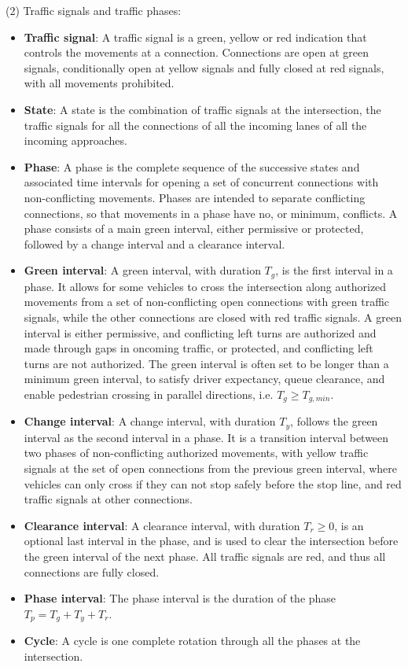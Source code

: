 (2) Traffic signals and traffic phases:
\begin{itemize}
\setlength\itemsep{-0.5em}
  \item \textbf{Traffic signal}: A traffic signal is a green, yellow or red indication that controls the movements at a connection. Connections are open at green signals, conditionally open at yellow signals and fully closed at red signals, with all movements prohibited.
  \item \textbf{State}: A state is the combination of traffic signals at the intersection, the traffic signals for all the connections of all the incoming lanes of all the incoming approaches.
  \item \textbf{Phase}: A phase is the complete sequence of the successive states and associated time intervals for opening a set of concurrent connections with non-conflicting movements. Phases are intended to separate conflicting connections, so that movements in a phase have no, or minimum, conflicts. A phase consists of a main green interval, either permissive or protected, followed by a change interval and a clearance interval.
  \item \textbf{Green interval}: A green interval, with duration $T_g$, is the first interval in a phase. It allows for some vehicles to cross the intersection along authorized movements from a set of non-conflicting open connections with green traffic signals, while the other connections are closed with red traffic signals. A green interval is either permissive, and conflicting left turns are authorized and made through gaps in oncoming traffic, or protected, and conflicting left turns are not authorized. The green interval is often set to be longer than a minimum green interval, to satisfy driver expectancy, queue clearance, and enable pedestrian crossing in parallel directions, i.e. $T_g \ge T_{g,min}$. 
  \item \textbf{Change interval}: A change interval, with duration $T_y$, follows the green interval as the second interval in a phase. It is a transition interval between two phases of non-conflicting authorized movements, with yellow traffic signals at the set of open connections from the previous green interval,  where vehicles can only cross if they can not stop safely before the stop line, and red traffic signals at other connections.
  \item \textbf{Clearance interval}: A clearance interval, with duration $T_r \ge 0$, is an optional last interval in the phase, and is used to clear the intersection before the green interval of the next phase. All traffic signals are red, and thus all connections are fully closed.
  \item \textbf{Phase interval}: The phase interval is the duration of the phase $T_p = T_g + T_y + T_r$.
  \item \textbf{Cycle}: A cycle is one complete rotation through all the phases at the intersection.
\end{itemize}

